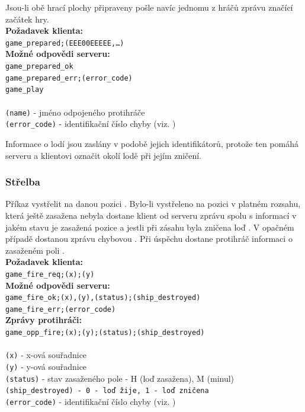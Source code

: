 \documentclass[12pt, a4paper]{article} %
\begin{document}
	\par Jsou-li obě hrací plochy připraveny pošle navíc jednomu z hráčů zprávu  značící začátek hry.\\
	\textbf{Požadavek klienta:}\\
	\texttt{game\_prepared;(EEE00EEEEE,…)}\\
	\textbf{Možné odpovědi serveru:}\\
	\texttt{game\_prepared\_ok}\\
	\texttt{game\_prepared\_err;(error\_code)}\\
	\texttt{game\_play}\\\\
	\texttt{(name)} - jméno odpojeného protihráče\\
	\texttt{(error\_code)} - identifikační číslo chyby (viz. )
		
	\begin{notes}
		\item Informace o lodí jsou zaslány v podobě jejich identifikátorů, protože ten pomáhá serveru a klientovi označit okolí lodě při jejím zničení.
	\end{notes}	
	\subsubsection{Střelba}
	\par Příkaz vystřelit na danou pozici . Bylo-li vystřeleno na pozici v platném rozsahu, která ještě zasažena nebyla dostane klient od serveru zprávu spolu s informací v jakém stavu je zasažená pozice a jestli při zásahu byla zničena loď . V opačném případě dostanou zprávu chybovou .
	Při úspěchu dostane protihráč informaci o zasaženém poli .\\
	\textbf{Požadavek klienta:}\\
	\texttt{game\_fire\_req;(x);(y)}\\
	\textbf{Možné odpovědi serveru:}\\
	\texttt{game\_fire\_ok;(x),(y),(status);(ship\_destroyed)}\\
	\texttt{game\_fire\_err;(error\_code)}\\
	\textbf{Zprávy protihráči:}\\
	\texttt{game\_opp\_fire;(x);(y);(status);(ship\_destroyed)}\\\\
	\texttt{(x)} - x-ová souřadnice\\
	\texttt{(y)} - y-ová souřadnice\\
	\texttt{(status)} - stav zasaženého pole - H (loď zasažena), M (minul)\\
	\texttt{(ship\_destroyed) - 0 - loď žije, 1 - loď zničena}\\
	\texttt{(error\_code)} - identifikační číslo chyby (viz. )
\end{document}
